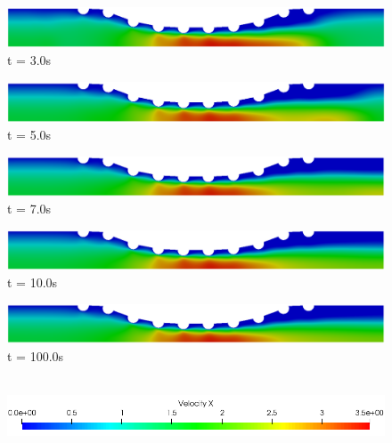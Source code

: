 \begin{figure}[H]
\begin{minipage}{.50\linewidth}
      \includegraphics[scale=0.18]{./02_chaps/cap_solution/figure/vel_quadCurvedStrut4.png}\\
      t = 3.0s
     \end{minipage}
     \begin{minipage}{.50\linewidth}
      \centering
      \includegraphics[scale=0.18]{./02_chaps/cap_solution/figure/vel_quadCurvedStrut5.png}\\
      t = 5.0s
     \end{minipage}%
     \begin{minipage}{.50\linewidth}
      \centering
      \includegraphics[scale=0.18]{./02_chaps/cap_solution/figure/vel_quadCurvedStrut6.png}\\
      t = 7.0s
     \end{minipage}
     \begin{minipage}{.50\linewidth}
     \medskip
      \centering
      \includegraphics[scale=0.18]{./02_chaps/cap_solution/figure/vel_quadCurvedStrut7.png}\\
      t = 10.0s
     \end{minipage}%
     \begin{minipage}{.50\linewidth}
     \medskip
      \centering
      \includegraphics[scale=0.18]{./02_chaps/cap_solution/figure/vel_quadCurvedStrut8.png}\\
      t = 100.0s
     \end{minipage}\\[10pt]
      \centering
      \includegraphics[scale=0.5]{./02_chaps/cap_solution/figure/vel_CurvedStrutScale.png}\\
     \medskip
     \label{quad velocity field curved stent}
\end{figure}


